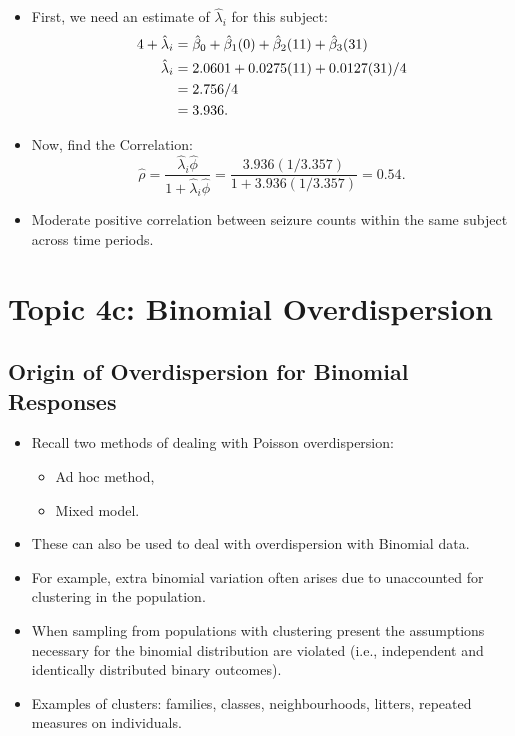 \documentclass[oneside]{book}\usepackage[]{graphicx}\usepackage[svgnames]{xcolor}
\let\exp\relax%
\let\log\relax%
\begin{document}
\begin{itemize}
      \item First, we need an estimate of $ \hat{\lambda}_i $ for this subject:
            \begin{align*}
                  \log{4}+\log{\hat{\lambda}_i}
                                  & =\hat{\beta}_0+\hat{\beta}_1(0)+\hat{\beta}_2(11)+\hat{\beta}_3(31) \\
                  \hat{\lambda}_i & =\exp{2.0601+0.0275(11)+0.0127(31)}/4                               \\
                                  & =\exp{2.756}/4                                                      \\
                                  & =3.936.
            \end{align*}
      \item Now, find the Correlation:
            \[ \hat{\rho}=\frac{\hat{\lambda}_i\hat{\phi}}{1+\hat{\lambda}_i\hat{\phi}}=\frac{3.936(1/3.357)}{1+3.936(1/3.357)}=0.54. \]
      \item Moderate positive correlation between seizure counts within the same subject
            across time periods.
\end{itemize}

\section*{Topic 4c: Binomial Overdispersion}
\subsection*{Origin of Overdispersion for Binomial Responses}
\begin{itemize}
    \item Recall two methods of dealing with Poisson overdispersion:
          \begin{itemize}
              \item Ad hoc method,
              \item Mixed model.
          \end{itemize}
    \item These can also be used to deal with overdispersion with Binomial data.
    \item For example, extra binomial variation often arises due to unaccounted for
          clustering in the population.
    \item When sampling from populations with clustering present the assumptions
          necessary for the binomial distribution are violated (i.e., independent and
          identically distributed binary outcomes).
    \item Examples of clusters: families, classes, neighbourhoods, litters, repeated measures
          on individuals.
\end{itemize}
\end{document}

